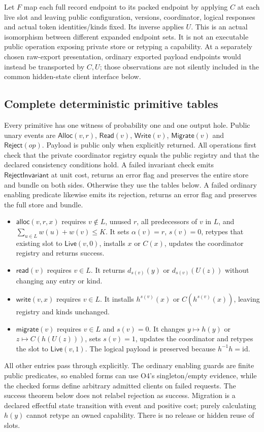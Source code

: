 \documentclass[11pt,a4paper]{article}
\theoremstyle{definition}
\newcommand{\id}{\mathrm{id}}
\begin{document}
Let $F$ map each full record endpoint to its packed endpoint by applying
$C$ at each live slot and leaving public configuration, versions,
coordinator, logical responses and actual token identities/kinds fixed.
Its inverse applies $U$. This is an actual isomorphism between different
expanded endpoint sets. It is not an executable public operation exposing
private store or retyping a capability. At a separately chosen raw-export
presentation, ordinary exported payload endpoints would instead be
transported by $C,U$; those observations are not silently included in the
common hidden-state client interface below.

\subsection{Complete deterministic primitive tables}
Every primitive has one witness of probability one and one output hole.
Public unary events are $\mathsf{Alloc}(v,r)$, $\mathsf{Read}(v)$,
$\mathsf{Write}(v)$, $\mathsf{Migrate}(v)$ and $\mathsf{Reject}(op)$.
Payload is public only when explicitly returned. All operations first check that the private coordinator registry equals
the public registry and that the declared consistency conditions hold.
A failed invariant check emits $\mathsf{RejectInvariant}$ at unit cost,
returns an error flag and preserves the entire store and bundle on both
sides. Otherwise they use the tables below. A failed ordinary enabling
predicate likewise emits its rejection, returns an error flag and preserves
the full store and bundle.
\begin{itemize}
\item $\mathsf{alloc}(v,r,x)$ requires $v\notin L$, unused $r$, all
  predecessors of $v$ in $L$, and
  $\sum_{u\in L}w(u)+w(v)\leq K$. It sets $\alpha(v)=r$, $s(v)=0$,
  retypes that existing slot to $\mathsf{Live}(v,0)$, installs $x$ or
  $C(x)$, updates the coordinator registry and returns success.
\item $\mathsf{read}(v)$ requires $v\in L$. It returns
  $d_{s(v)}(y)$ or $d_{s(v)}(U(z))$ without changing any entry or kind.
\item $\mathsf{write}(v,x)$ requires $v\in L$. It installs
  $h^{s(v)}(x)$ or $C(h^{s(v)}(x))$, leaving registry and kinds unchanged.
\item $\mathsf{migrate}(v)$ requires $v\in L$ and $s(v)=0$.
  It changes $y\mapsto h(y)$ or $z\mapsto C(h(U(z)))$, sets $s(v)=1$,
  updates the coordinator and retypes the slot to $\mathsf{Live}(v,1)$.
  The logical payload is preserved because $h^{-1}h=\id$.
\end{itemize}
All other entries pass through explicitly. The ordinary enabling guards are finite public
predicates, so enabled forms can use O4's singleton/empty evidence, while
the checked forms define arbitrary admitted clients on failed requests.
The success theorem below does not relabel rejection as success. Migration
is a declared effectful state transition with event and positive cost;
purely calculating $h(y)$ cannot retype an owned capability. There is no
release or hidden reuse of slots.
\end{document}
